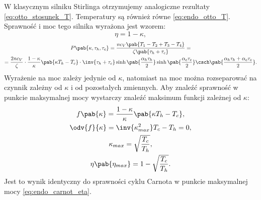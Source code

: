 W klasycznym silniku Stirlinga otrzymujemy analogiczne rezultaty \eqref{eq:otto_stosunek_T}. Temperatury są również równe \eqref{eq:endo_otto_T}. Sprawność i moc tego silnika wyrażona jest wzorem:
\begin{equation}
	\eta = 1 - \kappa \label{eq:otto_eta},
\end{equation}
\begin{multline}
	P\pab{\kappa,\tau_h,\tau_c} = \frac{n c_V \pab{T_1 - T_2 + T_3 - T_4}}{\zeta\pab{\tau_h + \tau_c}} = \\ =
	\frac{2 n c_V}{\zeta} \cdot \frac{1-\kappa}{\kappa}\pab{\kappa T_h - T_c} \cdot \inv{\tau_h + \tau_c}\sinh\pab{\frac{\alpha_h \tau_h}{2}}\sinh\pab{\frac{\alpha_c \tau_c}{2}}\csch\pab{\frac{\alpha_h \tau_h + \alpha_c \tau_c}{2}} \label{eq:otto_P}.
\end{multline}
Wyrażenie na moc zależy jedynie od \(\kappa\), natomiast na moc można rozseparować na czynnik zależny od \(\kappa\) i od pozostałych zmiennych. Aby znaleźć sprawność w punkcie maksymalnej mocy wystarczy znaleźć maksimum funkcji zależnej od \(\kappa\):
\begin{gather*}
	f\pab{\kappa} = \frac{1-\kappa}{\kappa}\pab{\kappa T_h - T_c}, \\
	\odv{f}{\kappa} = \inv{\kappa_{max}^2}T_c - T_h = 0, \\
	\kappa_{max} = \sqrt{\frac{T_c}{T_h}}, \\
	\eta\pab{\eta_{max}} = 1 - \sqrt{\frac{T_c}{T_h}}.
\end{gather*}
Jest to wynik identyczny do sprawności cyklu Carnota w punkcie maksymalnej mocy \eqref{eq:endo_carnot_eta}.
